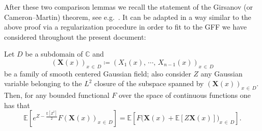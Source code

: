 \documentclass[AHL,Unicode,longabstracts,published]{cedram}
\newcommand{\C}{\mathbb{C}}
\newcommand{\expect}[1]{\mathbb{E}\left[#1\right]}
\begin{document}
After these two comparison lemmas we recall the statement of the Girsanov (or Cameron--Martin) theorem, see e.g.~\cite[Chapter~VIII]{RY91}. It can be adapted in a way similar to the above proof via a regularization procedure in order to fit to the GFF we have considered throughout the present document:

\begin{theo}\label{Girsanov}
Let $D$ be a subdomain of $\C$ and
\[
\left(\bm X(x)\right)_{x\,\in\,D}\coloneqq \left(X_1(x),\,\cdots,\,X_{n-1}(x)\right)_{x\,\in\,D}
\]
be a family of smooth centered Gaussian field; also consider $Z$ any Gaussian variable belonging to the $L^2$ closure of the subspace spanned by $(\bm X(x))_{x\,\in\,D}$. Then, for any bounded functional $F$ over the space of continuous functions one has that
\[
\expect{e^{Z-\frac{\expect{Z^2}}{2}}F(\bm X(x))_{x\,\in\,D}}=\expect{F\big(\bm X(x)+\expect{Z\bm X(x)}\big)_{x\,\in\,D}}.
\]
\end{theo}




\end{document}
